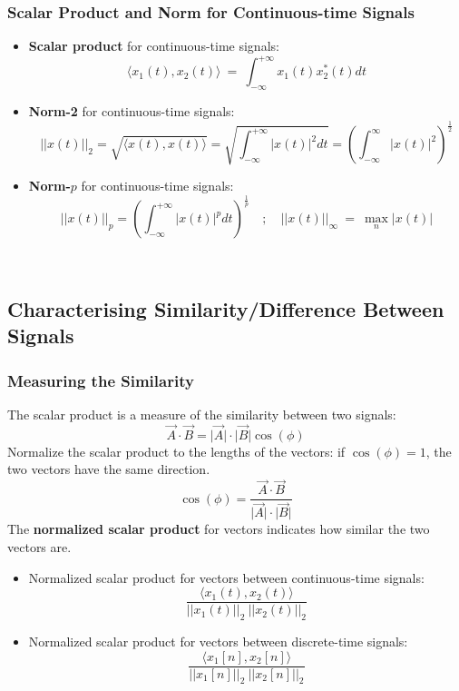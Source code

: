 \subsubsection{Scalar Product and Norm for Continuous-time Signals}
\begin{itemize}
 \item \textbf{Scalar product} for continuous-time signals:
  \[ \langle x_{1}(t), x_{2}(t) \rangle \ = \ \int_{-\infty}^{+\infty}  x_{1}(t) x_{2}^{*}(t) dt \]
 \item \textbf{Norm-2} for continuous-time signals:
  \[  \lvert \lvert x(t) \rvert \rvert_{2} = \sqrt{\langle x(t), x(t) \rangle} = \sqrt{\int_{-\infty}^{+\infty}\lvert
   x(t) \rvert^{2} dt} = \left( \int_{-\infty}^{\infty} \lvert x(t) \rvert^{2} \right) ^{\frac{1}{2}} \]
  \item \textbf{Norm-$p$} for continuous-time signals:
   \[ \lvert \lvert x(t) \rvert \rvert_{p} =\left( \int_{-\infty}^{+\infty} \lvert x(t) \rvert^{p} dt \right)^{\frac{1}{p}}
   \quad ; \quad \lvert \lvert x(t) \rvert \rvert_{\infty} \ = \ \max_{n}  \lvert x(t) \rvert \]
\end{itemize}
 
\ \\
\subsection{Characterising Similarity/Difference Between Signals}
\subsubsection{Measuring the Similarity}
 The scalar product is a measure of the similarity between two signals:
 \[ \vec{A} \cdot \vec{B} =\lvert \vec{A} \rvert \cdot \lvert \vec{B} \rvert \cos(\phi) \]
 Normalize the scalar product to the lengths of the vectors: if $\cos(\phi)=1$, the two vectors have the same direction.
\[ \cos(\phi) = \frac{\vec{A} \cdot \vec{B}}{\lvert \vec{A} \rvert \cdot \lvert \vec{B} \rvert} \]
The \textbf{normalized scalar product} for vectors indicates how similar the two vectors are.
\begin{itemize}
 \item Normalized scalar product for vectors between continuous-time signals: 
 \[ \frac{\langle x_{1}(t), x_{2}(t) \rangle}{ \lvert \lvert x_{1}(t) \rvert \rvert_{2} \ \lvert \lvert x_{2}(t) \rvert \rvert_{2}} \]
 \item Normalized scalar product for vectors between discrete-time signals: 
 \[ \frac{\langle x_{1}[n], x_{2}[n] \rangle}{ \lvert \lvert x_{1}[n] \rvert \rvert_{2} \ \lvert \lvert x_{2}[n] \rvert \rvert_{2}} \]
 \end{itemize}

